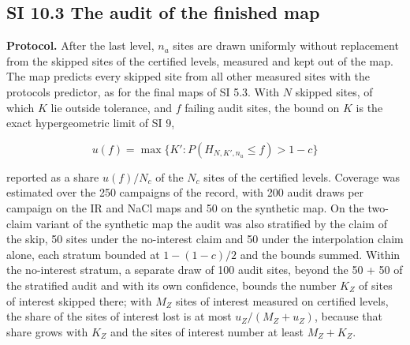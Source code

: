 \documentclass{iopjournal}
\begin{document}
\hypertarget{si-10.3-the-audit-of-the-finished-map}{%
\subsection*{SI 10.3 The audit of the finished map}\label{si-10.3-the-audit-of-the-finished-map}}

\textbf{Protocol.} After the last level, \(n_a\) sites are drawn uniformly without replacement from the skipped sites of the certified levels, measured and kept out of the map. The map predicts every skipped site from all other measured sites with the protocol\textquotesingle s predictor, as for the final maps of SI 5.3. With \(N\) skipped sites, of which \(K\) lie outside tolerance, and \(f\) failing audit sites, the bound on \(K\) is the exact hypergeometric limit of SI 9,

\[
u(f) = \max \{ K' : P(H_{N, K', n_a} \le f) > 1 - c \}
\]

reported as a share \(u(f)/N_c\) of the \(N_c\) sites of the certified levels. Coverage was estimated over the 250 campaigns of the record, with 200 audit draws per campaign on the IR and NaCl maps and 50 on the synthetic map. On the two-claim variant of the synthetic map the audit was also stratified by the claim of the skip, 50 sites under the no-interest claim and 50 under the interpolation claim alone, each stratum bounded at \(1 - (1 - c)/2\) and the bounds summed. Within the no-interest stratum, a separate draw of 100 audit sites, beyond the 50 + 50 of the stratified audit and with its own confidence, bounds the number \(K_Z\) of sites of interest skipped there; with \(M_Z\) sites of interest measured on certified levels, the share of the sites of interest lost is at most \(u_Z/(M_Z + u_Z)\), because that share grows with \(K_Z\) and the sites of interest number at least \(M_Z + K_Z\).
\end{document}
